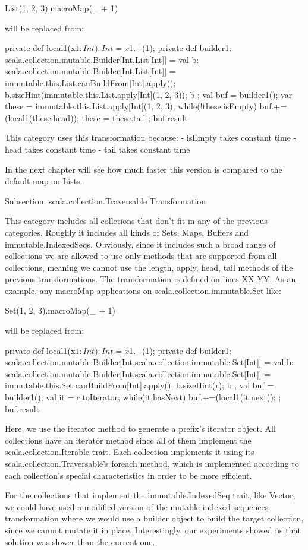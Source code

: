 List(1, 2, 3).macroMap(_ + 1)

will be replaced from:

{
  private def local1(x$1: Int): Int = x$1.+(1);
  private def builder1: scala.collection.mutable.Builder[Int,List[Int]] = {
    val b: scala.collection.mutable.Builder[Int,List[Int]] =
immutable.this.List.canBuildFrom[Int].apply();
    b.sizeHint(immutable.this.List.apply[Int](1, 2, 3));
    b
  };
  val buf = builder1();
  var these = immutable.this.List.apply[Int](1, 2, 3);
  while(!these.isEmpty){
    buf.+=(local1(these.head));
    these = these.tail
  };
  buf.result
}

This category uses this transformation because:
- isEmpty takes constant time
- head takes constant time
- tail takes constant time

In the next chapter will see how much faster this version is compared to the
default map on Lists.

Subsection: scala.collection.Traversable Transformation

This category includes all colletions that don't fit in any of the previous
categories. Roughly it includes all kinds of Sets, Maps, Buffers and
immutable.IndexedSeqs. Obviously, since it includes such a broad range of
collections we are allowed to use only methods that are supported from all
collections, meaning we cannot use the length, apply, head, tail methods of the
previous transformations. The transformation is defined on lines XX-YY. As an
example, any macroMap applications on scala.collection.immutable.Set like:

Set(1, 2, 3).macroMap(_ + 1)

will be replaced from:

{
  private def local1(x$1: Int): Int = x$1.+(1);
  private def builder1:
scala.collection.mutable.Builder[Int,scala.collection.immutable.Set[Int]] = {
    val b:
scala.collection.mutable.Builder[Int,scala.collection.immutable.Set[Int]] =
immutable.this.Set.canBuildFrom[Int].apply();
    b.sizeHint(r);
    b
  };
  val buf = builder1();
  val it = r.toIterator;
  while(it.hasNext){
    buf.+=(local1(it.next));
  };
  buf.result
}


Here, we use the iterator method to generate a prefix's iterator object. All
collections have an iterator method since all of them implement the
scala.collection.Iterable trait. Each collection implements it using its
scala.collection.Traversable's foreach method, which is implemented according to
each collection's special characteristics in order to be more efficient.

For the collections that implement the immutable.IndexedSeq trait, like Vector,
we could have used a modified version of the mutable indexed sequences
transformation where we would use a builder object to build the target
collection, since we cannot mutate it in place. Interestingly, our experiments
showed us that solution was slower than the current one.